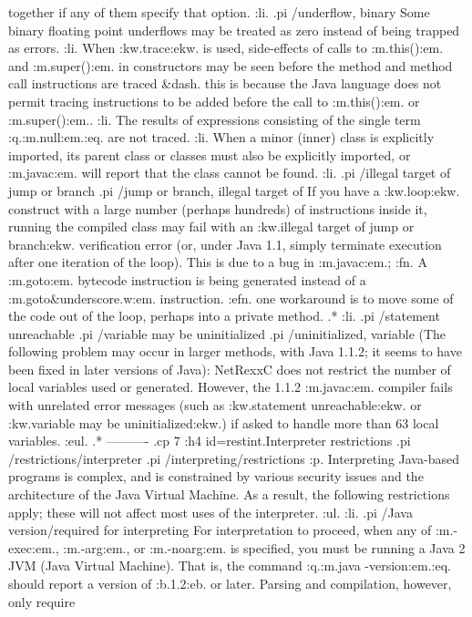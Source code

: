together if any of them specify that option.
:li.
.pi /underflow, binary
Some binary floating point underflows may be treated as zero instead
of being trapped as errors.
:li.
When :kw.trace:ekw. is used, side-effects of calls to :m.this():em.
and :m.super():em. in constructors may be seen before the method and
method call instructions are traced &dash. this is because the Java
language does not permit tracing instructions to be added before the
call to :m.this():em. or :m.super():em..
:li.
The results of expressions consisting of the single term
:q.:m.null:em.:eq. are not traced.
:li.
When a minor (inner) class is explicitly imported, its parent class or
classes must also be explicitly imported, or :m.javac:em. will report
that the class cannot be found.
:li.
.pi /illegal target of jump or branch
.pi /jump or branch, illegal target of
If you have a :kw.loop:ekw. construct with a large number (perhaps
hundreds) of instructions inside it, running the compiled class may fail
with an :kw.illegal target of jump or branch:ekw. verification error
(or, under Java 1.1, simply terminate execution after one iteration of
the loop).  This is due to a bug in :m.javac:em.;
:fn.
A :m.goto:em. bytecode instruction is being generated instead of
a :m.goto&underscore.w:em. instruction.
:efn.
one workaround is to move some of the code out of the loop, perhaps into
a private method.
.*
:li.
.pi /statement unreachable
.pi /variable may be uninitialized
.pi /uninitialized, variable
(The following problem may occur in larger methods, with Java 1.1.2; it
seems to have been fixed in later versions of Java):
NetRexxC does not restrict the number of local variables used or
generated.  However, the 1.1.2 :m.javac:em. compiler fails with
unrelated error messages (such as :kw.statement unreachable:ekw. or
:kw.variable may be uninitialized:ekw.) if asked to handle more than 63
local variables.
:eul.
.* ----------
.cp 7
:h4 id=restint.Interpreter restrictions
.pi /restrictions/interpreter
.pi /interpreting/restrictions
:p.
Interpreting Java-based programs is complex, and is constrained by
various security issues and the architecture of the Java Virtual
Machine.  As a result, the following restrictions apply; these will
not affect most uses of the interpreter.
:ul.
:li.
.pi /Java version/required for interpreting
For interpretation to proceed, when any of :m.-exec:em., :m.-arg:em.,
or :m.-noarg:em. is specified, you must be running a Java 2 JVM (Java
Virtual Machine).
That is, the command :q.:m.java -version:em.:eq. should report a version
of :b.1.2:eb. or later.  Parsing and compilation, however, only require
